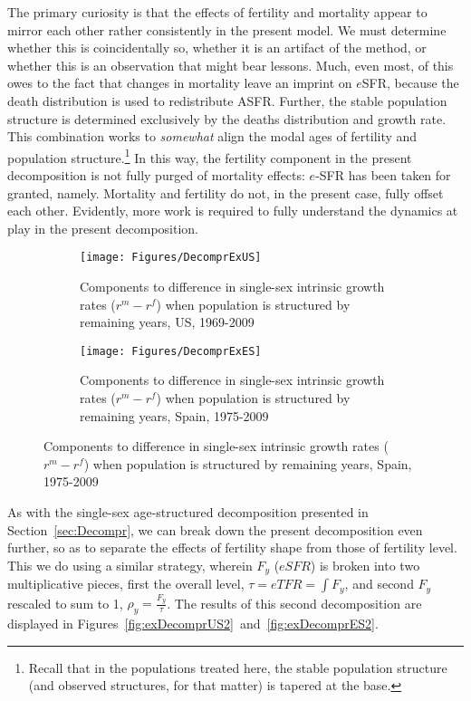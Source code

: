 The primary curiosity is that the effects of fertility and mortality appear to
mirror each other rather consistently in the present model. We must determine
whether this is coincidentally so, whether it is an artifact of the method, or
whether this is an observation that might bear lessons. Much, even most, of this
owes to the fact that changes in mortality leave an imprint on $e$SFR, because
the death distribution is used to redistribute ASFR. Further, the stable
population structure is determined exclusively by the deaths distribution and
growth rate. This combination works to \textit{somewhat} align the modal ages of
fertility and population structure.\footnote{Recall that in the populations
treated here, the stable population structure (and observed structures, for
that matter) is tapered at the base.} In this way, the fertility component in
the present decomposition is not fully purged of mortality effects: $e$-SFR has
been taken for granted, namely. Mortality and fertility do not, in the present
case, fully offset each other. Evidently, more work is required to fully
understand the dynamics at play in the present decomposition.

\begin{figure}
        \centering
        \begin{subfigure}
                \centering
                \caption{Components to difference in single-sex intrinsic growth
                rates ($r^m - r^f$) when population is structured by remaining
                years, US, 1969-2009}
                \texttt{[image: Figures/DecomprExUS]}
                \label{fig:exDecomprUS}
        \end{subfigure}
        \begin{subfigure}
                \centering
                \caption{Components to difference in single-sex intrinsic growth
                rates ($r^m - r^f$) when population is structured by remaining
                years, Spain, 1975-2009}
                \texttt{[image: Figures/DecomprExES]}
                \label{fig:exDecomprES}
        \end{subfigure}
\end{figure}
 \FloatBarrier
As with the single-sex age-structured decomposition presented in
Section~\ref{sec:Decompr}, we can break down the present decomposition even
further, so as to separate the effects of fertility shape from those of
fertility level. This we do using a similar strategy, wherein $F_y$ ($eSFR$) is
broken into two multiplicative pieces, first the overall level, $\tau = eTFR =
\int F_y$, and second $F_y$ rescaled to sum to 1, $\rho_y = \frac{F_y}{\tau}$.
The results of this second decomposition are displayed in
Figures~\ref{fig:exDecomprUS2}~and~\ref{fig:exDecomprES2}.


